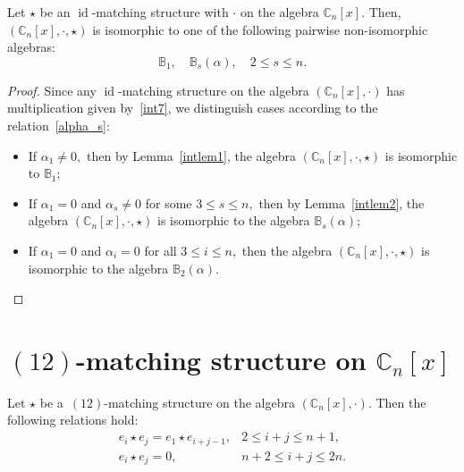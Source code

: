 \documentclass{jonasart}
\DeclareMathOperator{\id}{id}
\begin{document}
	\begin{theorem}\label{int} Let $ \star$ be an $\id$-matching structure with $\cdot$ on the algebra $\mathbb{C}_n [x]$. Then, $(\mathbb{C}_n [x], \cdot, \star)$ is isomorphic to one of the following pairwise non-isomorphic algebras:
		\[
			\mathbb{B}_1, \quad \mathbb{B}_s (\alpha), \quad 2\leq s\leq n.
		\]
	\end{theorem}

	\begin{proof}
		Since any $\id$-matching structure on the algebra $(\mathbb{C}_n [x],\cdot)$ has multiplication given by~\eqref{int7}, we distinguish cases according to the relation~\eqref{alpha_s}:
		\begin{itemize}
			\item If $\alpha_1\neq0,$ then by Lemma~\ref{intlem1}, the algebra $(\mathbb{C}_n [x], \cdot, \star)$ is isomorphic to $\mathbb{B}_{1};$
			\item If $\alpha_1 =0$ and $\alpha_s\neq0$ for some $3\leq s\leq n,$ then by Lemma~\ref{intlem2}, the algebra $(\mathbb{C}_n [x], \cdot, \star)$ is isomorphic to the algebra $\mathbb{B}_{s}(\alpha);$

			\item If $\alpha_1 =0$ and $\alpha_i =0$ for all $3\leq i\leq n,$ then the algebra $(\mathbb{C}_n [x], \cdot, \star)$ is isomorphic to the algebra $\mathbb{B}_{2}(\alpha).$
        \qedhere
		\end{itemize}
	\end{proof}

	\section{\texorpdfstring{$(12)$-matching structure on $\mathbb{C}_n [x]$}{(12)-matching structure on \_n [x]}}\label{12-matching-section}

	\begin{lemma}\label{Lem3.1}
		Let $\star$ be a~$(12)$-matching structure on the algebra $(\mathbb{C}_n [x],\cdot)$. Then the following relations hold:
		\[
			\begin{array}{lll}
				e_{i} \star e_j = e_1 \star e_{i+j-1}, & 2\leq i+j \leq n+1, \\[1mm]
				e_i \star e_j =0, & n+2 \leq i+j \leq 2n.
			\end{array}
		\]
	\end{lemma}
\end{document}
